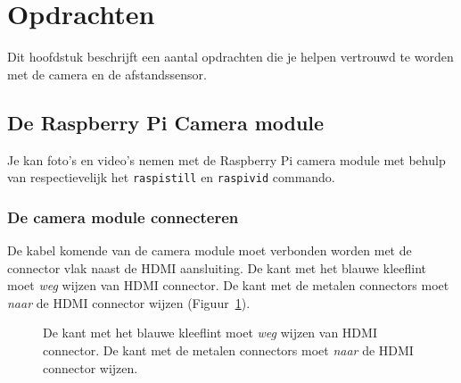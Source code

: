 \documentclass[a4paper]{article}
\begin{document}
  \section{Opdrachten}

    Dit hoofdstuk beschrijft een aantal opdrachten die je helpen
vertrouwd te worden met de camera en de afstandssensor.

  \subsection{De Raspberry Pi Camera module}

    Je kan foto's en video's nemen met de Raspberry Pi camera module
met behulp van respectievelijk het \texttt{raspistill} en
\texttt{raspivid} commando.

    \subsubsection{De camera module connecteren}
  
    De kabel komende van de camera module moet verbonden worden met de
connector vlak naast de HDMI aansluiting.  De kant met het blauwe
kleeflint moet \emph{weg} wijzen van HDMI connector.  De kant met de metalen
connectors moet \emph{naar} de HDMI connector wijzen
(Figuur~\ref{fig:camera}).

\begin{figure}[h!]
\centering
{}
\caption{De kant met het blauwe kleeflint moet \emph{weg} wijzen van
HDMI connector.  De kant met de metalen connectors moet \emph{naar} de
HDMI connector wijzen.}
\label{fig:camera}
\end{figure}
\end{document}
